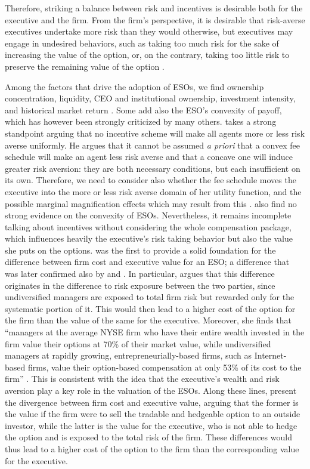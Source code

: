     Therefore, striking a balance between risk and incentives is desirable both for the executive and the firm. From the firm’s perspective, it is desirable that risk-averse executives undertake more risk than they would otherwise, but executives may engage in undesired behaviors, such as taking too much risk for the sake of increasing the value of the option, or, on the contrary, taking too little risk to preserve the remaining value of the option \citep{grinblatt1989adverse}.

    Among the factors that drive the adoption of ESOs, we find ownership concentration, liquidity, CEO and institutional ownership, investment intensity, and historical market return \citep{pasternack2002factors}. Some add also the ESO's convexity of payoff, which has however been strongly criticized by many others. \citet{ross2004compensation} takes a strong standpoint arguing that no incentive scheme will make all agents more or less risk averse uniformly. He argues that it cannot be assumed \textit{a priori} that a convex fee schedule will make an agent less risk averse and that a concave one will induce greater risk aversion: they are both necessary conditions, but each insufficient on its own. Therefore, we need to consider also whether the fee schedule moves the executive into the more or less risk averse domain of her utility function, and the possible marginal magnification effects which may result from this \citep{ross2004compensation}. \citet{hayes2012stock} also find no strong evidence on the convexity of ESOs. 
    Nevertheless, it remains incomplete talking about incentives without considering the whole compensation package, which influences heavily the executive's risk taking behavior but also the value she puts on the options. \citet{carpenter1998exercise} was the first to provide a solid foundation for the difference between firm cost and executive value for an ESO; a difference that was later confirmed also by \citet{meulbroek2001efficiency} and \citet{hall2003trouble}. In particular, \citet{meulbroek2001efficiency} argues that this difference originates in the difference to risk exposure between the two parties, since undiversified managers are exposed to total firm risk but rewarded only for the systematic portion of it. This would then lead to a higher cost of the option for the firm than the value of the same for the executive. Moreover, she finds that ``managers at the average NYSE firm who have their entire wealth invested in the firm value their options at 70\% of their market value, while undiversified managers at rapidly growing, entrepreneurially-based firms, such as Internet-based firms, value their option-based compensation at only 53\% of its cost to the firm'' \citep{meulbroek2001efficiency}. This is consistent with the idea that the executive's wealth and risk aversion play a key role in the valuation of the ESOs. Along these lines, \citet{hall2002stock} present the divergence between firm cost and executive value, arguing that the former is the value if the firm were to sell the tradable and hedgeable option to an outside investor, while the latter is the value for the executive, who is not able to hedge the option and is exposed to the total risk of the firm. These differences would thus lead to a higher cost of the option to the firm than the corresponding value for the executive.
